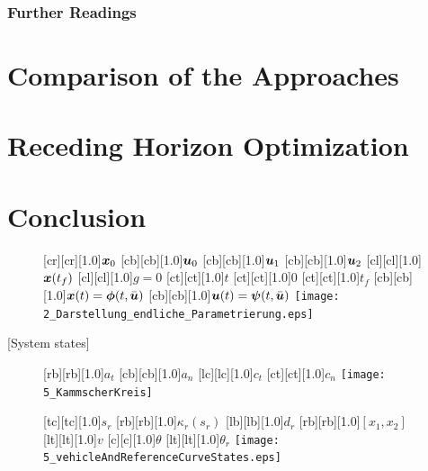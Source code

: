 \subsubsection{Further Readings}\label{S:57.3.3.4}


\section{Comparison of the Approaches}\label{S:57.4}

\section{Receding Horizon Optimization}\label{S:57.5}

\section{Conclusion}\label{S:57.6}

\begin{figure}[h]
\centering
	[cr][cr][1.0]{$\boldsymbol{x}_0$}
	[cb][cb][1.0]{$\boldsymbol{u}_0$}
	[cb][cb][1.0]{$\boldsymbol{u}_1$}
	[cb][cb][1.0]{$\boldsymbol{u}_2$}
	[cl][cl][1.0]{$\boldsymbol{x}(t_f)$}
	[cl][cl][1.0]{$g=0$}
	[ct][ct][1.0]{$t$}
	[ct][ct][1.0]{$0$}
	[ct][ct][1.0]{$t_f$}
	[cb][cb][1.0]{$\boldsymbol{x}(t) = \boldsymbol{\phi}(t,\bar{\boldsymbol{u}})$}
	[cb][cb][1.0]{$\boldsymbol{u}(t) = \boldsymbol{\psi}(t,\bar{\boldsymbol{u}})$}
 \texttt{[image: 2\_Darstellung\_endliche\_Parametrierung.eps]}
	\label{fig:parametrisierte_nmpc}
\end{figure}
%

 \hspace{1.8cm} [System states]
\begin{figure}[h]%
\centering
\begin{minipage}{0.45\textwidth}%
    [rb][rb][1.0]{$a_t$}
    [cb][cb][1.0]{$a_n$}
    [lc][lc][1.0]{$c_t$}
    [ct][ct][1.0]{$c_n$}
    \texttt{[image: 5\_KammscherKreis]}
    \label{fig:kammscherKreis}
\end{minipage}
\qquad
\begin{minipage}{0.45\textwidth}%
[tc][tc][1.0]{$s_r$}
    [rb][rb][1.0]{$\kappa_r(s_r)$}
    [lb][lb][1.0]{$d_r$}
    [rb][rb][1.0]{$[x_1, x_2]$}
    [lt][lt][1.0]{$v$}
    [c][c][1.0]{$\theta$}
    [lt][lt][1.0]{$\theta_r$}
    \texttt{[image: 5\_vehicleAndReferenceCurveStates.eps]}
    \label{fig:systemStates}
\end{minipage}%
\end{figure}%


